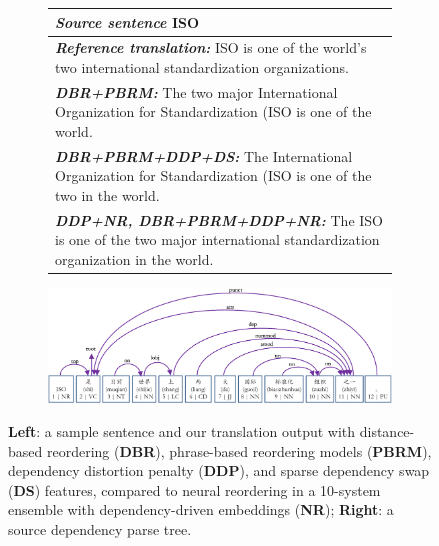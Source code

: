 \documentclass[letterpaper]{article}
\begin{document}
\begin{CJK}{UTF8}{gbsn}
\begin{figure}
\begin{subfigure}[b]{0.36\textwidth}
\footnotesize
\begin{tabular}{|L{\textwidth}|}
\hline
{\bf \em Source sentence} \newline
ISO\hspace{0.1cm}\hspace{0.1cm}\hspace{0.1cm}\hspace{0.1cm}\hspace{0.1cm}\hspace{0.1cm}\hspace{0.1cm}\hspace{0.1cm}\hspace{0.1cm}\hspace{0.1cm}\hspace{0.1cm}\\
\hline
{\bf \em Reference translation:} \newline
ISO is one of the world's two international standardization organizations.\\
\hline
{\bf \em DBR+PBRM:}\newline
The two major International Organization for Standardization (ISO is one of the world.\\
\hline

{\bf \em DBR+PBRM+DDP+DS:}\newline
The International Organization for Standardization (ISO is one of the two in the world.\\
\hline

{\bf \em DDP+NR, DBR+PBRM+DDP+NR:}\newline
The ISO is one of the two major international standardization organization in the world. \\
\hline
\end{tabular}

\end{subfigure}
\hfill
\begin{subfigure}[c]{0.6\textwidth}
{\centering
\small
\includegraphics[width=\textwidth]{comparison1parse.pdf}}
\end{subfigure}
\caption{\label{fig:comparison} {\bf Left}: a sample sentence and our translation output with distance-based reordering ({\bf DBR}), phrase-based reordering models ({\bf PBRM}), dependency distortion penalty ({\bf DDP}), and sparse dependency swap ({\bf DS}) features, compared to neural reordering in a 10-system ensemble with dependency-driven embeddings ({\bf NR}); {\bf Right}: a source dependency parse tree.}
\end{figure}
\end{CJK}
\end{document}
